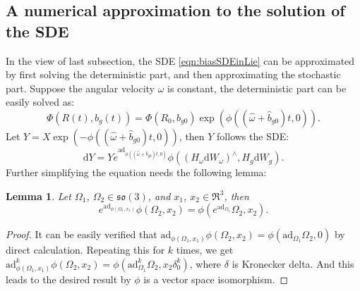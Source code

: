 \documentclass[10pt]{article}
\newtheorem{lemma}{Lemma}
\begin{document}
\subsection{A numerical approximation to the solution of the SDE}

In the view of last subsection, the SDE \eqref{eqn:biasSDEinLie} can be approximated by first solving the deterministic part, and then approximating the stochastic part.
Suppose the angular velocity $\omega$ is constant, the deterministic part can be easily solved as:
\begin{equation}
	\Phi(R(t),b_g(t)) = \Phi(R_0,b_{g0})\exp\left(\phi\left((\hat{\omega}+\hat{b}_{g0})t,0\right)\right).
\end{equation}
Let $Y = X\exp\left(-\phi\left((\hat{\omega}+\hat{b}_{g0})t,0\right)\right)$, then $Y$ follows the SDE:
\begin{equation}
	\mathrm{d}Y = Ye^{\mathrm{ad}_{\phi\left((\hat{\omega}+\hat{b}_{g0})t,0\right)}}\phi\left(\left(H_\omega\mathrm{d}W_\omega\right)^\wedge,H_g\mathrm{d}W_g\right).
\end{equation}
Further simplifying the equation needs the following lemma:
\begin{lemma}
	Let $\Omega_1$, $\Omega_2\in\mathfrak{so}(3)$, and $x_1$, $x_2\in\mathfrak{R}^3$, then
	\begin{equation}
		e^{\mathrm{ad}_{\phi(\Omega_1,x_1)}}\phi(\Omega_2,x_2) = \phi(e^{\mathrm{ad}_{\Omega_1}}\Omega_2,x_2).
	\end{equation}
\end{lemma}
\begin{proof}
	It can be easily verified that $\mathrm{ad}_{\phi(\Omega_1,x_1)}\phi(\Omega_2,x_2) = \phi(\mathrm{ad}_{\Omega_1}\Omega_2,0)$ by direct calculation.
	Repeating this for $k$ times, we get $\mathrm{ad}^k_{\phi(\Omega_1,x_1)}\phi(\Omega_2,x_2) = \phi(\mathrm{ad}^k_{\Omega_1}\Omega_2,x_2\delta^k_0)$, where $\delta$ is Kronecker delta.
	And this leads to the desired result by $\phi$ is a vector space isomorphism.
\end{proof}
\end{document}
